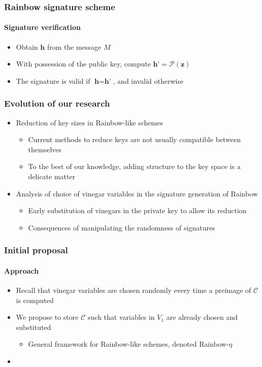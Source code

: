 \documentclass[12pt]{beamer}
\begin{document}
\begin{frame}
  \frametitle{Rainbow signature scheme}
  \framesubtitle{Signature verification}
  \begin{itemize}
    \item Obtain $\textbf{h}$ from the message $M$
    \item With possession of the public key, compute
        $\textbf{h'} = \mathcal{P}(\textbf{z})$
    \item The signature is valid if $\textbf{h} = \textbf{h'}$, and invalid
        otherwise
  \end{itemize}
\end{frame}

\begin{frame}
  \frametitle{Evolution of our research}
  \begin{itemize}
    \item Reduction of key sizes in Rainbow-like schemes
    \begin{itemize}[itemsep=1pt]
      \item Current methods to reduce keys are not usually compatible between
          themselves
      \item To the best of our knowledge, adding structure to the key space is
          a delicate matter
    \end{itemize}
    \item Analysis of choice of vinegar variables in the signature generation
        of Rainbow
    \begin{itemize}[itemsep=1pt]
      \item Early substitution of vinegars in the private key to allow its
          reduction
      \item Consequences of manipulating the randomness of signatures
    \end{itemize}
  \end{itemize}
\end{frame}

\begin{frame}
  \frametitle{Initial proposal}
  \framesubtitle{Approach}
  \begin{itemize}
    \item Recall that vinegar variables are chosen randomly every time
        a preimage of $\mathcal{C}$ is computed
    \item We propose to store $\mathcal{C}$ such that variables in $V_{1}$ are
        already chosen and substituted
    \begin{itemize}
      \item General framework for Rainbow-like schemes, denoted Rainbow-$\eta$
    \end{itemize}
    \item {\small {}}
  \end{itemize}
\end{frame}
\end{document}
